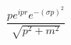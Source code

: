 \documentclass{minimal}
\begin{document}
$$\frac{p e^{ipr} e^{-(\sigma p)^2}}{\sqrt{p^2 + m^2}}$$
\end{document}
